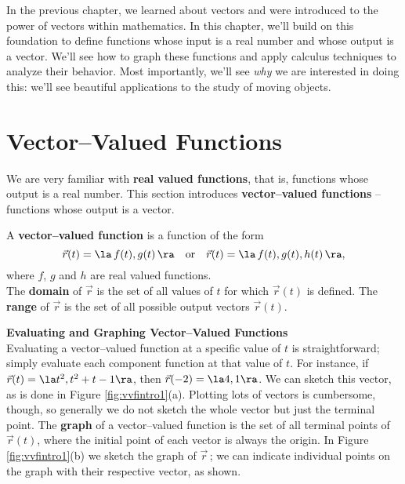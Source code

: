 In the previous chapter, we learned about vectors and were introduced to the power of vectors within mathematics. In this chapter, we'll build on this foundation to define functions whose input is a real number and whose output is a vector. We'll see how to graph these functions and apply calculus techniques to analyze their behavior. Most importantly, we'll see \textit{why} we are interested in doing this: we'll see beautiful applications to the study of moving objects.

\section{Vector--Valued Functions}\label{sec:vvf}

We are very familiar with \textbf{real valued functions}, that is, functions whose output is a real number. This section introduces \textbf{vector--valued functions} -- functions whose output is a vector. 

{A \textbf{vector--valued function} is a function of the form 
$$\vec r(t) = \la\, f(t),g(t)\,\ra \quad \text{or}\quad \vec r(t) = \la \,f(t),g(t),h(t)\,\ra,$$
where $f$, $g$ and $h$ are real valued functions.\\

The \textbf{domain} of $\vec r$ is the set of all values of $t$ for which $\vec r(t)$ is defined. The \textbf{range} of $\vec r$ is the set of all possible output vectors $\vec r(t)$.
}

\noindent\textbf{Evaluating and Graphing Vector--Valued Functions}\\

Evaluating a vector--valued function at a specific value of $t$ is straightforward; simply evaluate each component function at that value of $t$. For instance, if $\vec r(t) = \la t^2,t^2+t-1\ra$, then $\vec r(-2) = \la 4,1\ra$. We can sketch this vector, as is done in Figure \ref{fig:vvfintro1}(a). Plotting lots of vectors is cumbersome, though, so generally we do not sketch the whole vector but just the terminal point. The \textbf{graph} of a vector--valued function is the set of all terminal points of $\vec r(t)$, where the initial point of each vector is always the origin. In Figure \ref{fig:vvfintro1}(b) we sketch the graph of $\vec r$\,; we can indicate individual points on the graph with their respective vector, as shown.


